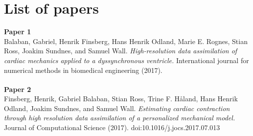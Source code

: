 
\section*{List of papers}

\textbf{Paper 1}
\hfill  \\ \noindent
Balaban, Gabriel, Henrik Finsberg, Hans Henrik Odland, Marie
E. Rognes, Stian Ross, Joakim Sundnes, and Samuel
Wall. \emph{High-resolution data assimilation of cardiac mechanics
  applied to a dyssynchronous ventricle.}  International journal for
numerical methods in biomedical engineering (2017). 
\\\\
\noindent
\textbf{Paper 2}
\hfill  \\ 
Finsberg, Henrik, Gabriel Balaban,  Stian Ross, Trine F. H\r{a}land,
Hans Henrik Odland, Joakim Sundnes, and Samuel
Wall. \emph{Estimating cardiac contraction through high resolution
  data assimilation of a personalized mechanical model.} Journal of
Computational Science (2017). doi:10.1016/j.jocs.2017.07.013

